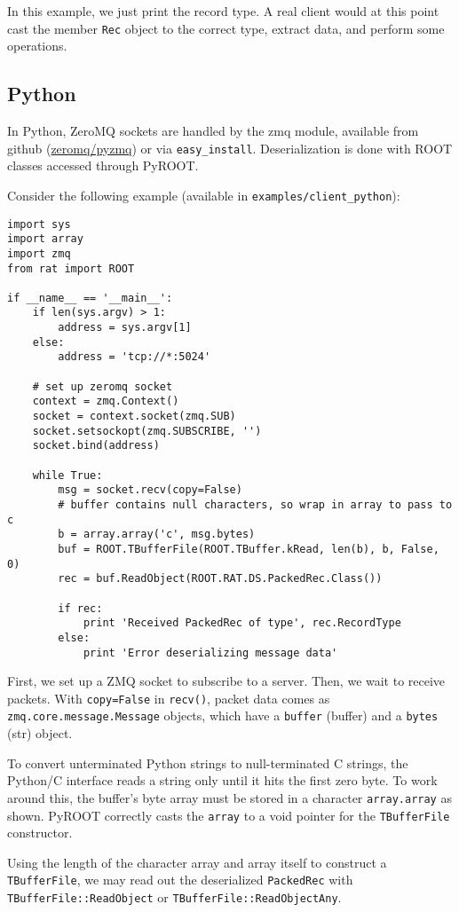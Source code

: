 \documentclass{article}
\begin{document}
In this example, we just print the record type. A real client would at this point cast the member {\tt Rec} object to the correct type, extract data, and perform some operations.

\subsection{Python}
In Python, ZeroMQ sockets are handled by the zmq module, available from github (\href{http://github.com/zeromq/pyzmq}{zeromq/pyzmq}) or via {\tt easy\_install}. Deserialization is done with ROOT classes accessed through PyROOT.

Consider the following example (available in {\tt examples/client\_python}):

\begin{verbatim}
import sys
import array
import zmq
from rat import ROOT

if __name__ == '__main__':
    if len(sys.argv) > 1:
        address = sys.argv[1]
    else:
        address = 'tcp://*:5024'

    # set up zeromq socket
    context = zmq.Context()
    socket = context.socket(zmq.SUB)
    socket.setsockopt(zmq.SUBSCRIBE, '')
    socket.bind(address)

    while True:
        msg = socket.recv(copy=False)
        # buffer contains null characters, so wrap in array to pass to c
        b = array.array('c', msg.bytes)
        buf = ROOT.TBufferFile(ROOT.TBuffer.kRead, len(b), b, False, 0)
        rec = buf.ReadObject(ROOT.RAT.DS.PackedRec.Class())

        if rec:
            print 'Received PackedRec of type', rec.RecordType
        else:
            print 'Error deserializing message data'
\end{verbatim}

First, we set up a ZMQ socket to subscribe to a server. Then, we wait to receive packets. With {\tt copy=False} in {\tt recv()}, packet data comes as {\tt zmq.core.message.Message} objects, which have a {\tt buffer} (buffer) and a {\tt bytes} (str) object.

To convert unterminated Python strings to null-terminated C strings, the Python/C interface reads a string only until it hits the first zero byte. To work around this, the buffer's byte array must be stored in a character {\tt array.array} as shown. PyROOT correctly casts the {\tt array} to a void pointer for the {\tt TBufferFile} constructor.

Using the length of the character array and array itself to construct a {\tt TBufferFile}, we may read out the deserialized {\tt PackedRec} with {\tt TBufferFile::ReadObject} or {\tt TBufferFile::ReadObjectAny}.
\end{document}
